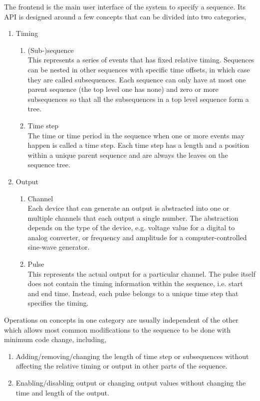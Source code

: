 The frontend is the main user interface of the system to specify a sequence.
Its API is designed around a few concepts that can be divided into two categories,
\begin{enumerate}
\item Timing
  \begin{enumerate}
  \item (Sub-)sequence\\
    This represents a series of events that has fixed relative timing.
    Sequences can be nested in other sequences with specific time offsets,
    in which case they are called subsequences.
    Each sequence can only have at most one parent sequence (the top level one has none)
    and zero or more subsequences
    so that all the subsequences in a top level sequence form a tree.
  \item Time step\\
    The time or time period in the sequence when one or more events may happen
    is called a time step.
    Each time step has a length and a position within a unique parent sequence
    and are always the leaves on the sequence tree.
  \end{enumerate}
\item Output
  \begin{enumerate}
  \item Channel\\
    Each device that can generate an output is abstracted into
    one or multiple channels that each output a single number.
    The abstraction depends on the type of the device,
    e.g. voltage value for a digital to analog converter,
    or frequency and amplitude for a computer-controlled sine-wave generator.
  \item Pulse\\
    This represents the actual output for a particular channel.
    The pulse itself does not contain the timing information within the sequence,
    i.e. start and end time.
    Instead, each pulse belongs to a unique time step that specifies the timing.
  \end{enumerate}
\end{enumerate}
Operations on concepts in one category are usually independent of the other
which allows most common modifications to the sequence to be done
with minimum code change, including,
\begin{enumerate}
\item Adding/removing/changing the length of time step or subsequences
  without affecting the relative timing or output in other parts of the sequence.
\item Enabling/disabling output or changing output values
  without changing the time and length of the output.
\end{enumerate}

